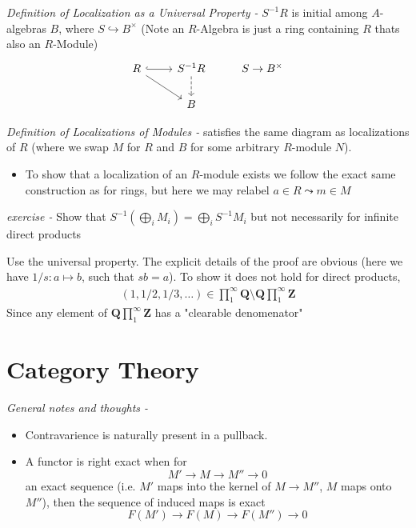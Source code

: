 \documentclass[11pt]{article}
\theoremstyle{definition}
\begin{document}
    \emph{Definition of Localization as a Universal Property -} \(S^{-1}R\) is initial among \(A\)-algebras \(B\), where \(S \hookrightarrow B^\times\) (Note an \(R\)-Algebra is just a ring containing \(R\) thats also an \(R\)-Module)
    \begin{equation*}
        \begin{tikzcd}
            R \arrow[r, hook] \arrow[dr]
            & S^{-1}R \arrow[d, dashed]
            & S \to B^\times\\
            & B
        \end{tikzcd}
    \end{equation*}

    \emph{Definition of Localizations of Modules - } satisfies the same diagram as localizations of \(R\) (where we swap \(M\) for \(R\) and \(B\) for some arbitrary \(R\)-module \(N\)).
    
    \begin{itemize}
        \item To show that a localization of an \(R\)-module exists we follow the exact same construction as for rings, but here we may relabel \(a \in R \leadsto m \in M\)
    \end{itemize}

    \emph{exercise - } Show that \(S^{-1}\left(\bigoplus_i M_i\right) = \bigoplus_i S^{-1}M_i\) but not necessarily for infinite direct products

    Use the universal property. The explicit details of the proof are obvious (here we have \(1/s: a \mapsto b\), such that \(sb = a\)). To show it does not hold for direct products,
    \begin{align*}
        (1,1/2,1/3,\hdots) \in \prod_1^\infty \mathbf{Q} \setminus \mathbf{Q}\prod_1^\infty \mathbf{Z}
    \end{align*}
    Since any element of \(\mathbf{Q}\prod_1^\infty \mathbf{Z}\) has a "clearable denomenator"

    \newpage
    \section{Category Theory}

    \emph{General notes and thoughts - }
    \begin{itemize}
        \item Contravarience is naturally present in a pullback.
        \item A functor is right exact when for 
        \[M' \to M \to M'' \to 0\]
        an exact sequence (i.e. \(M'\) maps into the kernel of \(M \to M''\), \(M\) maps onto \(M''\)), then the sequence of induced maps is exact
        \[F(M') \to F(M) \to F(M'') \to 0\]
    \end{itemize}
\end{document}
